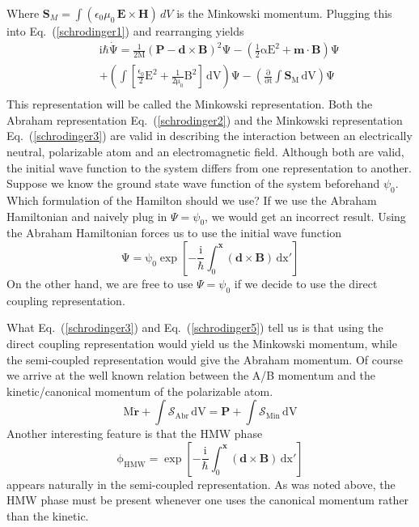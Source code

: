 \documentclass[twocolumn,english,pra,aps,superscriptaddress,floatfix]{revtex4-1}
\begin{document}
Where $\mathbf{S}_M=\int \left(\epsilon_0\mu_0\,\mathbf{E}\times\mathbf{H}\right) \, dV$ is the Minkowski momentum. Plugging this into  Eq.\ (\ref{schrodinger1}) and rearranging yields
\begin{eqnarray}
&&\mathrm{i\hbar\dot{\Psi}=\frac{1}{2M}\left(\mathbf{P}-\mathbf{d}\times\mathbf{B}\right)^2\Psi-\left(\frac{1}{2}\alpha E^2+\mathbf{m}\cdot\mathbf{B}\right)\Psi} \nonumber \\
&&\mathrm{+\left(\int\left[\frac{\epsilon_0}{2}E^2+\frac{1}{2\mu_0}B^2\right]\,dV\right)\Psi-\left(\frac{\partial}{\partial t}\int \mathbf{S}_M\,\mathrm{dV}\right)\Psi} \nonumber \\
\label{schrodinger3}
\end{eqnarray}
This representation will be called the Minkowski representation.  
Both the Abraham representation Eq.\ (\ref{schrodinger2}) and the Minkowski representation Eq.\ (\ref{schrodinger3}) are valid in describing the interaction between an electrically neutral, polarizable atom and an electromagnetic field.  Although both are valid, the initial wave function to the system differs from one representation to another. Suppose we know the ground state wave function of the system beforehand $\psi_0$.  Which formulation of the Hamilton should we use?   If we use the  Abraham Hamiltonian and naively plug in $\Psi=\psi_0$, we would get an incorrect result. Using the Abraham Hamiltonian forces us to use the initial wave function \cite{boyd}
\begin{equation}
\mathrm{\Psi=\psi_0\exp{\left[-\frac{\mathrm{i}}{\mathrm{\hbar}}\int_0^\mathbf{x} \left(\mathbf{d}\times\mathbf{B}\right) \, \mathrm{dx'}\right]}}
\end{equation}
On the other hand, we are free to use $\Psi=\psi_0$ if we decide to use the direct coupling representation.  
\vspace{5mm}

What Eq.\ (\ref{schrodinger3}) and Eq.\ (\ref{schrodinger5}) tell us is that using the direct coupling representation would yield us the Minkowski momentum, while the semi-coupled representation would give the Abraham momentum. Of course we arrive at the well known relation between the A/B momentum and the kinetic/canonical momentum of the polarizable atom.
\begin{equation}
\mathrm{M\dot{\mathbf{r}}+\int \mathbf{\mathcal{S}}_{Abr}\,dV=\mathbf{P}+\int \mathbf{\mathcal{S}}_{Min}\,dV}
\end{equation}
Another interesting feature is that the HMW phase
\begin{equation}
\mathrm{\phi_{HMW}=\exp{\left[-\frac{\mathrm{i}}{\mathrm{\hbar}}\int_0^\mathbf{x}(\mathbf{d}\times\mathbf{B})\,\mathrm{dx'}\right]}}
\label{HMWphase}
\end{equation}
appears naturally in the semi-coupled representation. As was noted above, the HMW phase must be present whenever one uses the canonical momentum rather than the kinetic.  
\vspace{5mm}
\end{document}

